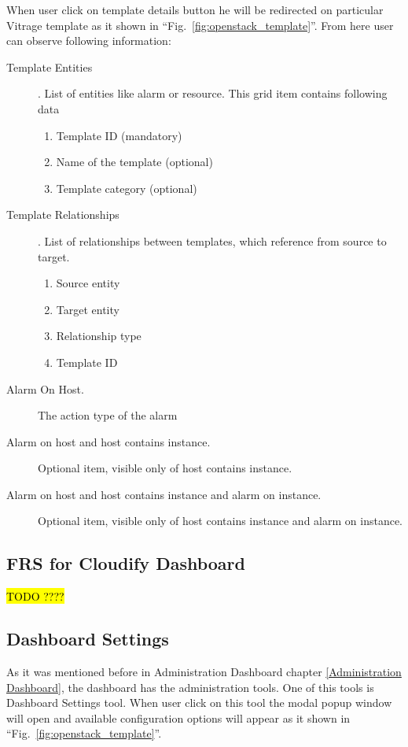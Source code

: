 When user click on template details button he will be redirected on particular Vitrage template as it shown in ``Fig.~\ref{fig:openstack_template}''. From here user can observe following information:
\begin{description}
\item[Template Entities]. List of entities like alarm or resource. This grid item contains following data
\begin{enumerate}
\item Template ID (mandatory)
\item Name of the template (optional)
\item Template category (optional)
\end{enumerate}
\item[Template Relationships]. List of relationships between templates, which reference from source to target.
\begin{enumerate}
\item Source entity
\item Target entity
\item Relationship type
\item Template ID
\end{enumerate}
\item[Alarm On Host.] The action type of the alarm
\item[Alarm on host and host contains instance.] Optional item, visible only of host contains instance.
\item[Alarm on host and host contains instance and alarm on instance.] Optional item, visible only of host contains instance and alarm on instance.

\end{description}



\subsection{FRS for Cloudify Dashboard}\label{Cloudify Dashboard}

\hl{TODO ????}

\subsection{Dashboard Settings}\label{Dashboard Settings}
As it was mentioned before in Administration Dashboard chapter \autoref{Administration Dashboard}, the dashboard has the administration tools. One of this tools is Dashboard Settings tool. When user click on this tool the modal popup window will open and available configuration options will appear as it shown in ``Fig.~\ref{fig:openstack_template}''.


